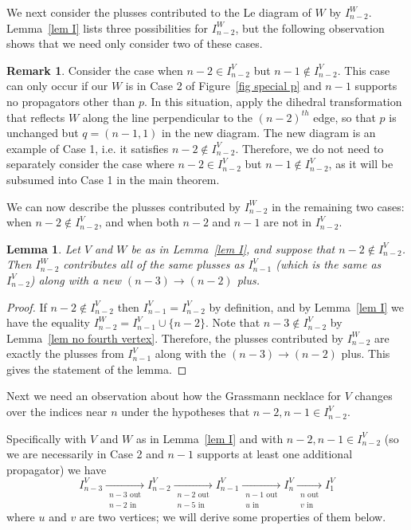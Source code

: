 \documentclass[11pt]{article}
\newtheorem{lem}[thm]{Lemma}
\theoremstyle{remark}
\theoremstyle{definition}
\newtheorem{rmk}[thm]{Remark}
\begin{document}
We next consider the plusses contributed to the Le diagram of $W$ by $I_{n-2}^W$. Lemma~\ref{lem I} lists three possibilities for $I_{n-2}^W$, but the following observation shows that we need only consider two of these cases.

\begin{rmk}\label{rem n-2 case} Consider the case when $n-2 \in I_{n-2}^V$ but $n-1 \not\in I_{n-2}^V$. This case can only occur if our $W$ is in Case 2 of Figure~\ref{fig special p} and $n-1$ supports no propagators other than $p$. In this situation, apply the dihedral transformation that reflects $W$ along the line perpendicular to the $(n-2)^{th}$ edge, so that $p$ is unchanged but $q = (n-1,1)$ in the new diagram. The new diagram is an example of Case 1, i.e. it satisfies $n-2 \not \in I_{n-2}^V$. Therefore, we do not need to separately consider the case where $n-2\in I_{n-2}^V$ but $n-1\not\in I_{n-2}^V$, as it will be subsumed into Case 1 in the main theorem.
\end{rmk}

We can now describe the plusses contributed by $I_{n-2}^W$ in the remaining two cases: when $n-2 \not\in I_{n-2}^V$, and when both $n-2$ and $n-1$ are not in $I_{n-2}^V$.

\begin{lem}\label{lem n-2 good}
  Let $V$ and $W$ be as in Lemma~\ref{lem I}, and suppose that $n-2 \not\in I_{n-2}^{V}$. Then $I_{n-2}^{W}$ contributes all of the same plusses as $I_{n-1}^{V}$ (which is the same as $I_{n-2}^{V}$) along with a new ${(n-3)\rightarrow (n-2)}$ plus.
\end{lem}


\begin{proof}
If $n-2\not\in I_{n-2}^{V}$ then $I_{n-1}^{V}=I_{n-2}^{V}$ by definition, and by Lemma~\ref{lem I} we have the equality ${I_{n-2}^{W} = I_{n-1}^{V} \cup \{n-2\}}$.  Note that $n-3\not\in I_{n-2}^{V}$ by Lemma~\ref{lem no fourth vertex}.  Therefore, the plusses contributed by $I_{n-2}^{W}$ are exactly the  plusses from $I_{n-1}^{V}$ along with the $(n-3)\rightarrow (n-2)$ plus.  This gives the statement of the lemma. 
\end{proof}

Next we need an observation about how the Grassmann necklace for $V$ changes over the indices near $n$ under the hypotheses that $n-2, n-1\in I_{n-2}^V$.

Specifically with $V$ and $W$ as in Lemma~\ref{lem I} and with $n-2, n-1\in I_{n-2}^V$ (so we are necessarily in Case 2 and $n-1$ supports at least one additional propagator) we have
  \begin{equation}\label{eq necklace}
  I_{n-3}^{V} \xrightarrow[\substack{n-3\text{ out}\\n-2\text{ in}}]{} I_{n-2}^{V} \xrightarrow[\substack{n-2\text{ out}\\n-5\text{ in}}]{} I_{n-1}^{V} \xrightarrow[\substack{n-1\text{ out}\\ u \text{ in}}]{} I_{n}^{V}  \xrightarrow[\substack{n \text{ out}\\v \text{ in}}]{} I_1^{V}
  \end{equation}
where $u$ and $v$ are two vertices; we will derive some properties of them below.
\end{document}
